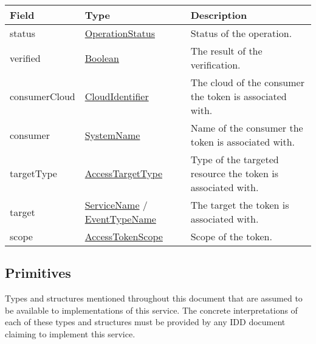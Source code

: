 \documentclass[a4paper]{arrowhead}
\newcommand{\pref}[1]{{\textcolor{ArrowheadGrey}{\hyperref[sec:model:primitives:#1]{#1}}}}
\begin{document}
\begin{table}[ht!]
\begin{tabularx}{\textwidth}{| p{4.25cm} | p{4.5cm} | X |} \hline
\rowcolor{gray!33} Field & Type & Description \\ \hline
status & \pref{OperationStatus} & Status of the operation. \\ \hline
verified & \pref{Boolean} & The result of the verification. \\ \hline
consumerCloud & \pref{CloudIdentifier} & The cloud of the consumer the token is associated with. \\ \hline
consumer & \pref{SystemName} & Name of the consumer the token is associated with. \\ \hline
targetType & \pref{AccessTargetType} & Type of the targeted resource the token is associated with. \\ \hline
target & \pref{ServiceName} / \pref{EventTypeName} & The target the token is associated with. \\ \hline
scope & \hyperref[sec:model:AccessTokenScope]{AccessTokenScope} & Scope of the token. \\ \hline
\end{tabularx}
\end{table}

\newpage

\subsection{Primitives}
\label{sec:model:primitives}

Types and structures mentioned throughout this document that are assumed to be available to implementations of this service.
The concrete interpretations of each of these types and structures must be provided by any IDD document claiming to implement this service.
\end{document}
